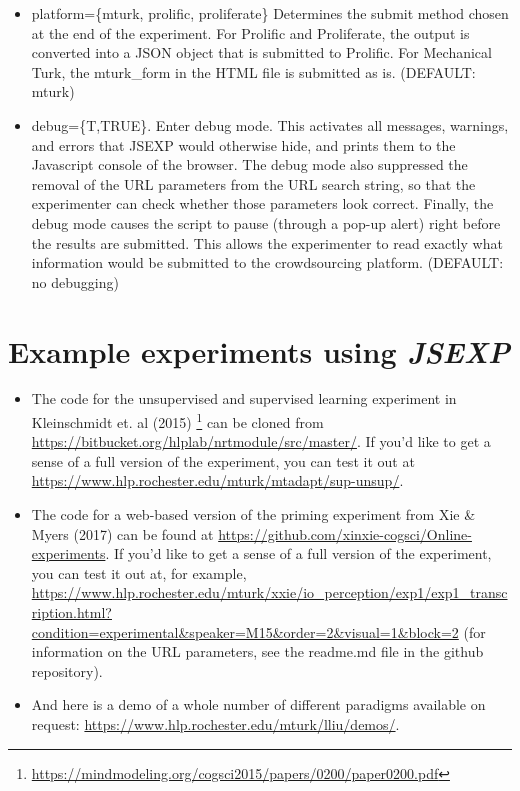 \documentclass{article}
\begin{document}
\begin{itemize}
    \item platform=\{mturk, prolific, proliferate\} Determines the submit method chosen at the end of the experiment. For Prolific and Proliferate, the output is converted into a JSON object that is submitted to Prolific. For Mechanical Turk, the mturk\_form in the HTML file is submitted as is. (DEFAULT: mturk)
    \item debug=\{T,TRUE\}. Enter debug mode. This activates all messages, warnings, and errors that JSEXP would otherwise hide, and prints them to the Javascript console of the browser. The debug mode also suppressed the removal of the URL parameters from the URL search string, so that the experimenter can check whether those parameters look correct. Finally, the debug mode causes the script to pause (through a pop-up alert) right before the results are submitted. This allows the experimenter to read exactly what information would be submitted to the crowdsourcing platform. (DEFAULT: no debugging)
 \end{itemize}


\section{Example experiments using {\em JSEXP}}

\begin{itemize}
    \item The code for the unsupervised and supervised learning experiment in Kleinschmidt et. al (2015) \footnote{\href{https://mindmodeling.org/cogsci2015/papers/0200/paper0200.pdf}{https://mindmodeling.org/cogsci2015/papers/0200/paper0200.pdf}} can be cloned from \url{https://bitbucket.org/hlplab/nrtmodule/src/master/}. If you'd like to get a sense of a full version of the experiment, you can test it out at \url{https://www.hlp.rochester.edu/mturk/mtadapt/sup-unsup/}.
    \item The code for a web-based version of the priming experiment from Xie \& Myers (2017) can be found at \url{https://github.com/xinxie-cogsci/Online-experiments}. If you'd like to get a sense of a full version of the experiment, you can test it out at, for example, \url{https://www.hlp.rochester.edu/mturk/xxie/io_perception/exp1/exp1_transcription.html?condition=experimental&speaker=M15&order=2&visual=1&block=2} (for information on the URL parameters, see the readme.md file in the github repository).
    \item And here is a demo of a whole number of different paradigms available on request: \url{https://www.hlp.rochester.edu/mturk/lliu/demos/}.
\end{itemize}
\end{document}

